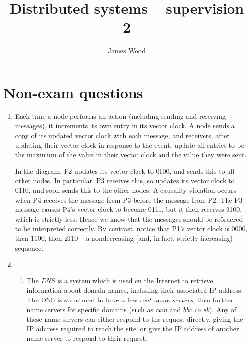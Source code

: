 \documentclass{article}
\begin{document}
\title{Distributed systems -- supervision 2}
\author{James Wood}
\maketitle

\section{Non-exam questions}

\begin{enumerate}
  \item Each time a node performs an action (including sending and receiving messages), it increments its own entry in its vector clock. A node sends a copy of its updated vector clock with each message, and receivers, after updating their vector clock in response to the event, update all entries to be the maximum of the value in their vector clock and the value they were sent.

    In the diagram, P2 updates its vector clock to 0100, and sends this to all other nodes. In particular, P3 receives this, so updates its vector clock to 0110, and soon sends this to the other nodes. A causality violation occurs when P4 receives the message from P3 before the message from P2. The P3 message causes P4's vector clock to become 0111, but it then receives 0100, which is strictly less. Hence we know that the messages should be re\"ordered to be interpreted correctly. By contrast, notice that P1's vector clock is 0000, then 1100, then 2110 -- a nondecreasing (and, in fact, strictly increasing) sequence.
  \item
    \begin{enumerate}
      \item The \textit{DNS} is a system which is used on the Internet to retrieve information about domain names, including their associated IP address. The DNS is structured to have a few \textit{root name servers}, then further name servers for specific domains (such as \textit{com} and \textit{bbc.co.uk}). Any of these name servers can either respond to the request directly, giving the IP address required to reach the site, or give the IP address of another name server to respond to their request.


\end{enumerate}
\end{enumerate}
\end{document}
